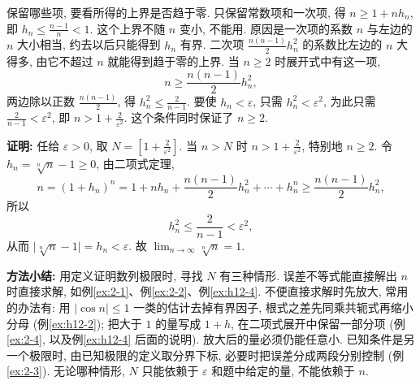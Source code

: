 \documentclass[UTF8,openany]{ctexbook}
\theoremstyle{chinesetextbook}
\newenvironment{cnproof}{\par\indent\textbf{证明:} \ignorespaces}{\par}
\begin{document}
保留哪些项, 要看所得的上界是否趋于零. 只保留常数项和一次项, 得 $n\ge1+nh_n$, 即 $\displaystyle h_n\le\frac{n-1}n<1$. 这个上界不随 $n$ 变小, 不能用. 原因是一次项的系数 $n$ 与左边的 $n$ 大小相当, 约去以后只能得到 $h_n$ 有界. 二次项 $\displaystyle\frac{n(n-1)}2h_n^2$ 的系数比左边的 $n$ 大得多, 由它不超过 $n$ 就能得到趋于零的上界. 当 $n\ge2$ 时展开式中有这一项,
\[
n\ge\frac{n(n-1)}2h_n^2,
\]
两边除以正数 $\displaystyle\frac{n(n-1)}2$, 得 $\displaystyle h_n^2\le\frac2{n-1}$. 要使 $h_n<\varepsilon$, 只需 $h_n^2<\varepsilon^2$, 为此只需 $\displaystyle\frac2{n-1}<\varepsilon^2$, 即 $\displaystyle n>1+\frac2{\varepsilon^2}$. 这个条件同时保证了 $n\ge2$.
\begin{cnproof}
任给 $\varepsilon>0$, 取 $\displaystyle N=\left[1+\frac2{\varepsilon^2}\right]$. 当 $n>N$ 时 $\displaystyle n>1+\frac2{\varepsilon^2}$, 特别地 $n\ge2$. 令 $h_n=\sqrt[n]n-1\ge0$, 由二项式定理,
\[
n=(1+h_n)^n=1+nh_n+\frac{n(n-1)}2h_n^2+\cdots+h_n^n\ge\frac{n(n-1)}2h_n^2,
\]
所以
\[
h_n^2\le\frac2{n-1}<\varepsilon^2,
\]
从而 $\bigl|\sqrt[n]n-1\bigr|=h_n<\varepsilon$. 故 $\displaystyle\lim_{n\to\infty}\sqrt[n]n=1$.
\end{cnproof}
\par\indent\textbf{方法小结:} 用定义证明数列极限时, 寻找 $N$ 有三种情形. 误差不等式能直接解出 $n$ 时直接求解, 如例\ref{ex:2-1}、例\ref{ex:2-2}、例\ref{ex:h12-4}. 不便直接求解时先放大, 常用的办法有: 用 $|\cos n|\le1$ 一类的估计去掉有界因子, 根式之差先同乘共轭式再缩小分母 (例\ref{ex:h12-2}); 把大于 $1$ 的量写成 $1+h$, 在二项式展开中保留一部分项 (例\ref{ex:2-4}, 以及例\ref{ex:h12-4} 后面的说明). 放大后的量必须仍能任意小. 已知条件是另一个极限时, 由已知极限的定义取分界下标, 必要时把误差分成两段分别控制 (例\ref{ex:2-3}). 无论哪种情形, $N$ 只能依赖于 $\varepsilon$ 和题中给定的量, 不能依赖于 $n$.
\end{document}
